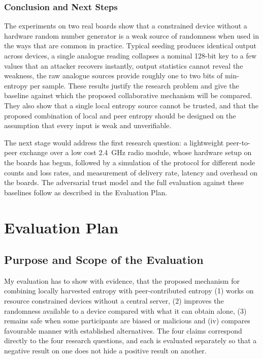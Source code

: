 \documentclass[a4paper, 12pt]{article}
\begin{document}
\subsubsection{Conclusion and Next Steps}
 
The experiments on two real boards show that a constrained device without a hardware random number generator is a weak source of randomness when used in the ways that are common in practice. Typical seeding produces identical output across devices, a single analogue reading collapses a nominal 128-bit key to a few values that an attacker recovers instantly, output statistics cannot reveal the weakness, the raw analogue sources provide roughly one to two bits of min-entropy per sample. These results justify the research problem and give the baseline against which the proposed collaborative mechanism will be compared. They also show that a single local entropy source cannot be trusted, and that the proposed combination of local and peer entropy should be designed on the assumption that every input is weak and unverifiable.
 
The next stage would address the first research question: a lightweight peer-to-peer exchange over a low cost 2.4~GHz radio module, whose hardware setup on the boards has begun, followed by a simulation of the protocol for different node counts and loss rates, and measurement of delivery rate, latency and overhead on the boards. The adversarial trust model and the full evaluation against these baselines follow as described in the Evaluation Plan.

\section{Evaluation Plan}
\subsection{Purpose and Scope of the Evaluation}
 
My evaluation has to show with evidence, that the proposed mechanism for combining locally harvested entropy with peer-contributed entropy (1) works on resource constrained devices without a central server, (2) improves the randomness available to a device compared with what it can obtain alone, (3) remains safe when some participants are biased or malicious and (iv) compares favourable manner with established alternatives. The four claims correspond directly to the four research questions, and each is evaluated separately so that a negative result on one does not hide a positive result on another.
 
\end{document}
